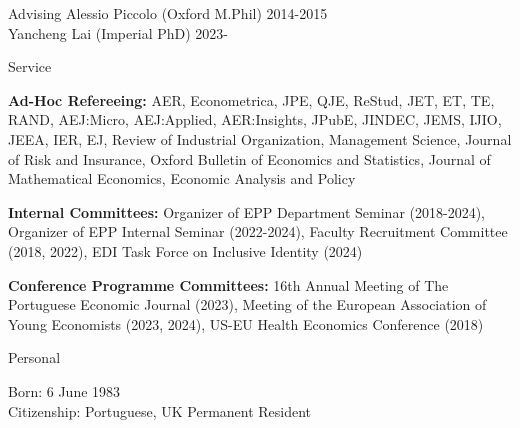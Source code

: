 \documentclass{resume}
\begin{document}
\begin{rSection}{Advising}
	Alessio Piccolo (Oxford M.Phil) \hfill {2014-2015} \\
	Yancheng Lai (Imperial PhD) \hfill {2023-}		
\end{rSection}




\begin{rSection}{Service}

\textbf{Ad-Hoc Refereeing:} AER, Econometrica, JPE, QJE, ReStud, 
JET, ET, TE, RAND, AEJ:Micro, AEJ:Applied, AER:Insights, 
JPubE, JINDEC, JEMS, IJIO, JEEA, IER, EJ, 
Review of Industrial Organization, Management Science, 
Journal of Risk and Insurance, Oxford Bulletin of Economics and Statistics, 
Journal of Mathematical Economics, Economic Analysis and Policy


\textbf{Internal Committees:} Organizer of EPP Department Seminar (2018-2024), 
Organizer of EPP Internal Seminar  (2022-2024), 
Faculty Recruitment Committee (2018, 2022), 
EDI Task Force on Inclusive Identity (2024)

\textbf{Conference Programme Committees:} 16th Annual Meeting of The Portuguese Economic Journal (2023), 
Meeting of the European Association of Young Economists (2023, 2024), 
US-EU Health Economics Conference (2018)
	
\end{rSection}




\begin{rSection}{Personal}

Born: 6 June 1983
\\ Citizenship: Portuguese, UK Permanent Resident

\end{rSection}
\end{document}
